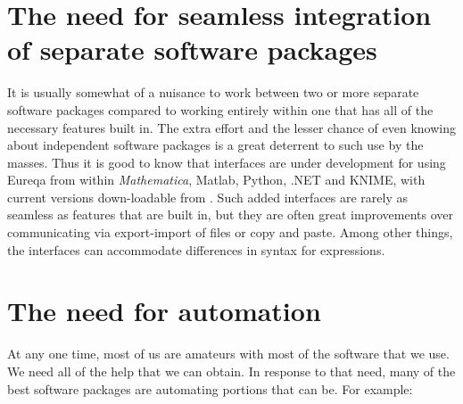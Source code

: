 \documentclass[12pt,english]{article}
\begin{document}
\section{The need for seamless integration of separate software packages}

It is usually somewhat of a nuisance to work between two or more separate
software packages compared to working entirely within one that has
all of the necessary features built in. The extra effort and the lesser
chance of even knowing about independent software packages is a great
deterrent to such use by the masses. Thus it is good to know that
interfaces are under development for using Eureqa from within \textsl{Mathematica},
Matlab, Python, .NET and KNIME, with current versions down-loadable
from \cite{Schmidt}. Such added interfaces are rarely as seamless
as features that are built in, but they are often great improvements
over communicating via export-import of files or copy and paste. Among
other things, the interfaces can accommodate differences in syntax
for expressions.


\section{The need for automation}

At any one time, most of us are amateurs with most of the software
that we use. We need all of the help that we can obtain. In response
to that need, many of the best software packages are automating portions
that can be. For example:\vspace{-5pt}
\end{document}
